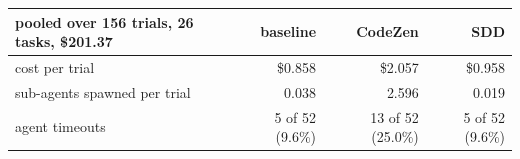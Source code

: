 
\begin{tabular}{@{}lrrr@{}}
\toprule
pooled over 156 trials, 26 tasks, \$201.37 & baseline & CodeZen & SDD \\
\midrule
cost per trial & \$0.858 & \$2.057 & \$0.958 \\
sub-agents spawned per trial & 0.038 & 2.596 & 0.019 \\
agent timeouts & 5 of 52 (9.6\%) & 13 of 52 (25.0\%) & 5 of 52 (9.6\%) \\
\bottomrule
\end{tabular}
